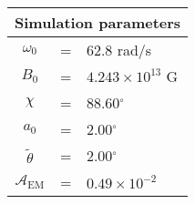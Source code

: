  \begin{tabular}{ccl}
\multicolumn{3}{c}{Simulation parameters} \\
\hline
$\omega_0$  &=& 62.8 rad/s\\
$B_0$  &=& $ 4.243\times 10^{13} $ G \\
$\chi$  &=& 88.60$^{\circ}$ \\
$a_0$ &=& 2.00$^{\circ}$ \\
$\tilde{\theta}$ &= & 2.00$^{\circ}$ \\
$\mathcal{A}_{\mathrm{EM}}$ &= & $ 0.49\times 10^{-2} $
\end{tabular}
    